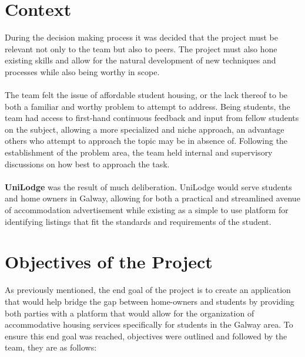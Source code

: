 \section{Context}
During the decision making process it was decided that the project must be relevant not only to the team but also to peers. The project must also hone existing skills and allow for the natural development of new techniques and processes while also being worthy in scope. 

\paragraph{}
The team felt the issue of affordable student housing, or the lack thereof to be both a familiar and worthy problem to attempt to address. Being students, the team had access to first-hand continuous feedback and input from fellow students on the subject, allowing a more specialized and niche approach, an advantage others who attempt to approach the topic may be in absence of. Following the establishment of the problem area, the team held internal and supervisory discussions on how best to approach the task.

\paragraph{}
\textbf{UniLodge} was the result of much deliberation. UniLodge would serve students and home owners in Galway, allowing for both a practical and streamlined avenue of accommodation advertisement while existing as a simple to use platform for identifying listings that fit the standards and requirements of the student. 
\section{Objectives of the Project}
As previously mentioned, the end goal of the project is to create an application that would help bridge the gap between home-owners and students by providing both parties with a platform that would allow for the organization of accommodative housing services specifically for students in the Galway area. To ensure this end goal was reached, objectives were outlined and followed by the team, they are as follows:

